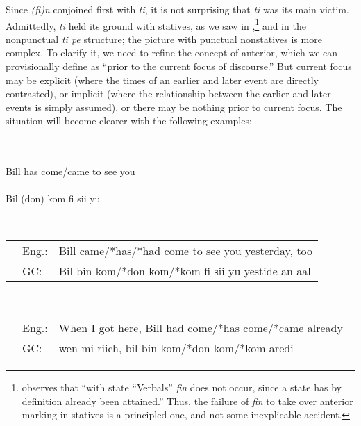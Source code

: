 Since \textit{(fi)n} conjoined first with \textit{ti}, it is not surprising that \textit{ti} was its main victim. Admittedly, \textit{ti} held its ground with statives, as we saw in ,\footnote{\citet{Corne1981} observes that ``with state ``Verbals'' \textit{fin} does not occur, since a state has by definition already been attained.'' Thus, the failure of \textit{fin} to take over anterior marking in statives is a principled one, and not some inexplicable accident.} and in the nonpunctual \textit{ti pe} structure; the picture with punctual nonstatives is more complex. To clarify it, we need to refine the concept of anterior, which we can provisionally define as ``prior to the current focus of discourse.'' But current focus may be explicit (where the times of an earlier and later event are directly contrasted), or implicit (where the relationship between the earlier and later events is simply assumed), or there may be nothing prior to current focus. The situation will become clearer with the following examples:


\ea\label{ex:2:103}
\\
\ea 
\langinfo{\langEng}{}{}\\
Bill has come/came to see you\\
\ex 
\langinfo{\langGC}{}{}\\
Bil (don) kom fi sii yu\\
\z
\z

\ea\label{ex:2:104}
\\
\begin{tabular}{lll}
& Eng.: & Bill came/*has/*had come to see you yesterday, too\\
& GC: & Bil bin kom/*don kom/*kom fi sii yu yestide an aal
\end{tabular}
\z


\ea\label{ex:2:105}
\\
\begin{tabular}{lll}
& Eng.: & When I got here, Bill had come/*has come/*came already\\
& GC: & wen mi riich, bil bin kom/*don kom/*kom aredi
\end{tabular}
\z


